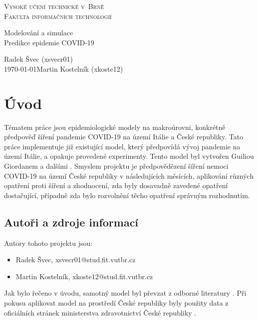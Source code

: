 \documentclass[a4paper,11pt]{article}
\begin{document}
	\begin{titlepage}
		\begin{center}
			\textsc{\Huge Vysoké učení technické v~Brně\\
				\vspace{0.4em}\huge Fakulta informačních technologií}
			
			
			{\LARGE Modelování a simulace\\
				\Huge Predikce epidemie COVID-19\\ \vspace{0.3em}}
			
			
			{\Large \hfill Radek Švec (xsvecr01)\\ \today \hfill Martin Kostelník (xkoste12)}
		\end{center}
	\end{titlepage}

	\section{Úvod}
		Tématem práce jsou epidemiologické modely na makroúrovni, konkrétně předpověď šíření pandemie COVID-19 na území Itálie a České republiky. Tato práce implementuje již existující model, který předpovídá vývoj pandemie na území Itálie, a opakuje provedené experimenty. Tento model byl vytvořen Guiliou Giordanem a dalšími \cite{source}. Smyslem projektu je předpovědězení šíření nemoci COVID-19 na území České republiky v následujících měsících, aplikování různých opatření proti šíření a zhodnocení, zda byly dosavadně zavedené opatření dostačující, případně zda bylo rozvolnění těcho opatření správným rozhodnutím.
		
	\subsection{Autoři a zdroje informací}
		Autory tohoto projektu jsou:
		\begin{itemize}
			\item Radek Švec, xsvecr01@stud.fit.vutbr.cz
			\item Martin Kostelník, xkoste12@stud.fit.vutbr.cz
		\end{itemize}
	
	Jak bylo řečeno v úvodu, samotný model byl převzat z odborné literatury \cite{source}. Při pokusu aplikovat model na prostředí České republiky byly použity data z oficiálních stránek ministerstva zdravotnictví České republiky \cite{mzcr}.
	
\end{document}
